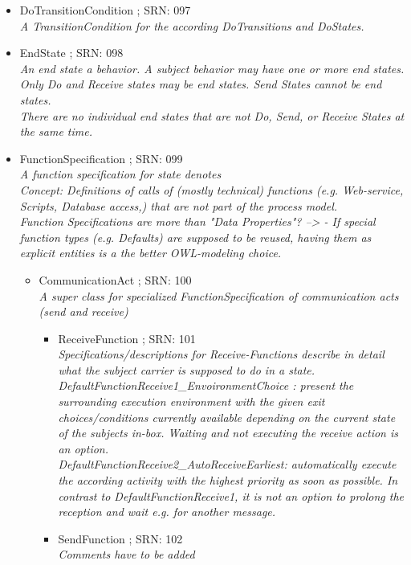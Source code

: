 \begin{itemize}
\begin{itemize}
			\item DoTransitionCondition ; SRN: 097 \\ \textit{A TransitionCondition for the according DoTransitions and DoStates.}
			\item EndState ; SRN: 098 \\ \textit{An end state a behavior. A subject behavior may have one or more end states. Only Do and Receive states may be end states. Send States cannot be end states.\\
				There are no individual end states that are not Do, Send, or Receive States at the same time.}
			\item FunctionSpecification ; SRN: 099 \\ \textit{A function specification for state denotes\\
				Concept: Definitions of calls of (mostly technical) functions (e.g. Web-service, Scripts, Database access,) that are not part of the process model.\\
				Function Specifications are more than "Data Properties"? --> - If special function types (e.g. Defaults) are supposed to be reused, having them as explicit entities is a the better OWL-modeling choice.}
			\begin{itemize}
				\item CommunicationAct ; SRN: 100 \\ \textit{A super class for specialized FunctionSpecification of communication acts (send and receive)}
				\begin{itemize}
					\item ReceiveFunction ; SRN: 101 \\ \textit{Specifications/descriptions for Receive-Functions describe in detail what the subject carrier is supposed to do in a state.\\
						DefaultFunctionReceive1\_EnvoironmentChoice : present the surrounding execution environment with the given exit choices/conditions currently available depending on the current state of the subjects in-box. Waiting and not executing the receive action is an option.\\
						DefaultFunctionReceive2\_AutoReceiveEarliest: automatically execute the according activity with the highest priority as soon as possible. In contrast to DefaultFunctionReceive1, it is not an option to prolong the reception and wait e.g. for another message.}
					\item SendFunction ; SRN: 102 \\ \textit{Comments have to be added}

\end{itemize}
\end{itemize}
\end{itemize}
\end{itemize}
